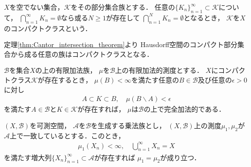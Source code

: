 		\begin{screen}
			\begin{dfn}[コンパクトクラス]
				$X$を空でない集合，$\mathcal{K}$をその部分集合族とする．
				任意の$\{K_n\}_{n=1}^\infty \subset \mathcal{K}$について，
				$\bigcap_{n=1}^\infty K_n = \emptyset$なら或る$N \geq 1$が存在して
				$\bigcap_{n=1}^N K_n = \emptyset$となるとき，
				$\mathcal{K}$を$X$のコンパクトクラスという．
			\end{dfn}
		\end{screen}
		定理\ref{thm:Cantor_intersection_theorem}より
		Hausdorff空間のコンパクト部分集合から成る任意の族はコンパクトクラスとなる．
		
		\begin{screen}
			\begin{thm}
			\end{thm}
		\end{screen}
		
		\begin{screen}
			\begin{thm}[コンパクトクラスの存在と完全加法性]
				$\mathcal{B}$を集合$X$の上の有限加法族，
				$\mu$を$\mathcal{B}$上の有限加法的測度とする．
				$X$にコンパクトクラス$\mathcal{K}$が存在するとき，
				$\mu(B) < \infty$を満たす任意の$B \in \mathcal{B}$及び任意の$\epsilon > 0$に対し
				\begin{align}
					A \subset K \subset B,
					\quad \mu(B \backslash A) < \epsilon
				\end{align}
				を満たす$A \in \mathcal{B}$と$K \in \mathcal{K}$が存在すれば，
				$\mu$は$\mathcal{B}$の上で完全加法的である．
			\end{thm}
		\end{screen}
		
		\begin{screen}
			\begin{thm}[測度の一致の定理]\label{thm:identity_theorem_of_measures}
				$(X,\mathcal{B})$を可測空間，
				$\mathcal{A}$を$\mathcal{B}$を生成する乗法族とし，
				$(X,\mathcal{B})$上の測度$\mu_1,\mu_2$が
				$\mathcal{A}$上で一致しているとする．このとき，
				\begin{align}
					\mu_1(X_n) < \infty,
					\quad \bigcup_{n=1}^\infty X_n = X
				\end{align}
				を満たす増大列$\{X_n\}_{n=1}^\infty \subset \mathcal{A}$が存在すれば
				$\mu_1 = \mu_2$が成り立つ．
			\end{thm}
		\end{screen}
		
